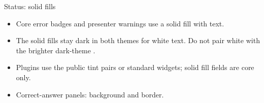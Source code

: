 \begin{standardframe}{Status: solid fills}

\begin{itemize}
\item Core error badges and presenter warnings use a solid fill with  text.
\item The solid fills stay dark in both themes for white text. Do not pair white with the brighter dark-theme .
\item Plugins use the public tint pairs or standard widgets; solid fill fields are core only.
\item Correct-answer panels:  background and  border.
\end{itemize}
\end{standardframe}
